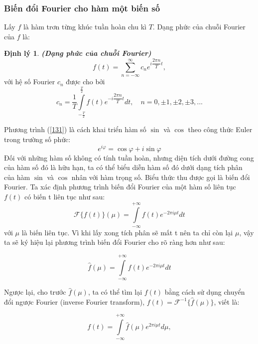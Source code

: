 \documentclass[12pt,a4paper]{report}
\numberwithin{equation}{section}
\theoremstyle{definition} %
\newtheorem{dl}{Định lý}[chapter]
\begin{document}
\subsubsection{Biến đổi Fourier cho hàm một biến số}
Lấy $f$ là hàm trơn từng khúc tuần hoàn chu kì $T$. Dạng phức của chuỗi Fourier của $f$ là: 
\begin{dl}	
\textbf{\textit{(Dạng phức của chuỗi Fourier)}}
\begin{equation}
	\label{131}
    f(t)= \sum_{n=-\infty} ^{\infty} c_ne^{i\dfrac{2\pi n}{T}t},
\end{equation}
với hệ số Fourier $c_n$ được cho bởi
\begin{equation}
	\label{132}
    c_n=\dfrac{1}{T}\displaystyle\int\limits_{-\frac{T}{2}}^{\frac{T}{2}} f(t)e^{-i\dfrac{2\pi n}{T}t}dt,\quad n=0,\pm 1,\pm 2, \pm 3,...
\end{equation}
\end{dl}
Phương trình (\ref{131}) là cách khai triển hàm số $\sin$ và $\cos$ theo công thức Euler trong trường số phức:
\begin{equation}
	\label{133}
    e^{i\varphi}=\cos\varphi+i \sin\varphi
\end{equation}
Đối với những hàm số không có tính tuần hoàn, nhưng diện tích dưới đường cong của hàm số đó là hữu hạn, ta có thể biểu diễn hàm số đó dưới dạng tích phân của hàm $\sin$ và $\cos$ nhân với hàm trọng số. Biểu thức thu được gọi là biến đổi Fourier.
Ta xác định phương trình biến đổi Fourier của một hàm số liên tục $f(t)$ có biến t liên tục như sau:
\begin{equation}
	\label{134}
    \mathcal{F}\{f(t)\}(\mu)=\int\limits_{-\infty}^{+\infty}f(t)e^{-2\pi i  \mu t}dt
\end{equation}
với $\mu$ là biến liên tục. Vì khi lấy xong tích phân sẽ mất t nên ta chỉ còn lại $\mu$, vậy ta sẽ ký hiệu lại phương trình biến đổi Fourier cho rõ ràng hơn như sau:

\begin{equation}
	\label{135}
  \hat{f}(\mu)=\int\limits_{-\infty}^{+\infty}f(t)e^{-2\pi i \mu t}dt
\end{equation}

Ngược lại, cho trước $\hat{f}(\mu)$, ta có thể tìm lại $f(t)$ bằng cách sử dụng chuyển đổi ngược Fourier (inverse Fourier transform), $f(t)=\mathcal{F}^{-1}\{\hat{f}(\mu)\}$, viết là:

\begin{equation}
	\label{136}
    f(t)=\int\limits_{-\infty}^{+\infty}\hat{f}(\mu)e^{2\pi i \mu t}d\mu,
\end{equation}
\end{document}
